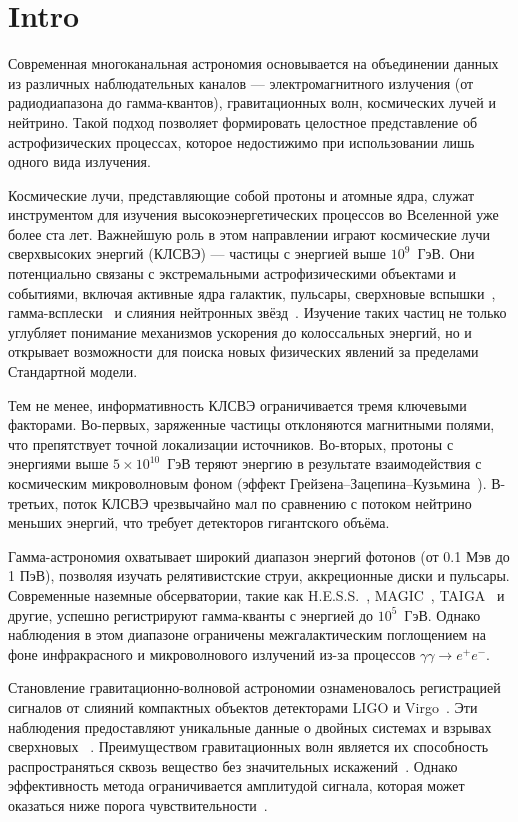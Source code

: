 \section{Intro}
Современная многоканальная астрономия основывается на объединении данных из различных наблюдательных каналов — электромагнитного излучения (от радиодиапазона до гамма-квантов), гравитационных волн, космических лучей и нейтрино. Такой подход позволяет формировать целостное представление об астрофизических процессах, которое недостижимо при использовании лишь одного вида излучения.

Космические лучи, представляющие собой протоны и атомные ядра, служат инструментом для изучения высокоэнергетических процессов во Вселенной уже более ста лет. Важнейшую роль в этом направлении играют космические лучи сверхвысоких энергий (КЛСВЭ) — частицы с энергией выше $10^9$~ГэВ. Они потенциально связаны с экстремальными астрофизическими объектами и событиями, включая активные ядра галактик, пульсары, сверхновые вспышки~\cite{auger2020anisotropy, auger2020spectrum}, гамма-всплески~\cite{kotera2011astrophysics} и слияния нейтронных звёзд~\cite{kimura2017ultrahigh}. Изучение таких частиц не только углубляет понимание механизмов ускорения до колоссальных энергий, но и открывает возможности для поиска новых физических явлений за пределами Стандартной модели.

Тем не менее, информативность КЛСВЭ ограничивается тремя ключевыми факторами. Во-первых, заряженные частицы отклоняются магнитными полями, что препятствует точной локализации источников. Во-вторых, протоны с энергиями выше $5\times10^{10}$~ГэВ теряют энергию в результате взаимодействия с космическим микроволновым фоном (эффект Грейзена–Зацепина–Кузьмина~\cite{greisen1966}). В-третьих, поток КЛСВЭ чрезвычайно мал по сравнению с потоком нейтрино меньших энергий, что требует детекторов гигантского объёма.

Гамма-астрономия охватывает широкий диапазон энергий фотонов (от 0.1 Мэв до 1 ПэВ), позволяя изучать релятивистские струи, аккреционные диски и пульсары. Современные наземные обсерватории, такие как H.E.S.S.~\cite{hess2021}, MAGIC~\cite{hessandmagic2021}, TAIGA~\cite{Elshoukrofy:2023My} и другие, успешно регистрируют гамма-кванты с энергией до $10^5$~ГэВ. Однако наблюдения в этом диапазоне ограничены межгалактическим поглощением на фоне инфракрасного и микроволнового излучений из-за процессов $\gamma\gamma \to e^+e^-$.

Становление гравитационно-волновой астрономии ознаменовалось регистрацией сигналов от слияний компактных объектов детекторами LIGO и Virgo~\cite{virgoandligo2016}. Эти наблюдения предоставляют уникальные данные о двойных системах и взрывах сверхновых ~\cite{Abbott:2017, Fan:2024}. Преимуществом гравитационных волн является их способность распространяться сквозь вещество без значительных искажений~\cite{Isaacson1968}. Однако эффективность метода ограничивается амплитудой сигнала, которая может оказаться ниже порога чувствительности~\cite{LIGOScientific:2018Sens}.

